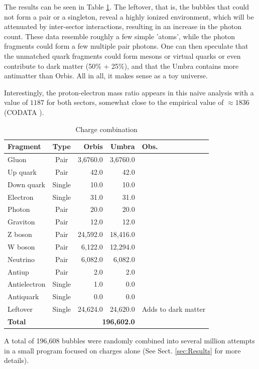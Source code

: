\documentclass[12pt,english]{article}
\begin{document}
The results can be seen in Table \ref{combina}. The leftover, that is, the bubbles that could not form a pair or a singleton, reveal a highly ionized environment, which will be attenuated by inter-sector interactions, resulting in an increase in the photon count. These data resemble roughly a few simple 'atoms', while the photon fragments could form a few multiple pair photons. One can then speculate that the unmatched quark fragments could form mesons or virtual quarks or even contribute to dark matter (50\% + 25\%), and that the Umbra contains more antimatter than Orbis. All in all, it makes sense as a toy universe. 

Interestingly, the proton-electron mass ratio appears in this naive analysis with a value of $1187$ for both sectors, somewhat close to the empirical value of $\approx1836$ (CODATA \cite{codata}). 

\begin{table}
\caption{Charge combination}

\medskip{}
\label{combina}
\begin{centering}
{\small{}}%
\begin{tabular}{|l|c|r|r|l|}
\hline 
\textbf{\small{}Fragment} & \textbf{\small{}Type} & \textbf{\small{}Orbis} & \textbf{Umbra} & \textbf{\small{}Obs.}\tabularnewline
\hline 
\hline 
{\small{}Gluon} & {\small{}Pair} & {\small{}3,6760.0} & {\small{}3,6760.0} & \tabularnewline
\hline 
{\small{}Up quark} & {\small{}Pair} & {\small{}42.0} & {\small{}42.0} & \tabularnewline
\hline 
{\small{}Down quark} & {\small{}Single} & {\small{}10.0} & {\small{}10.0} & \tabularnewline
\hline 
{\small{}Electron} & {\small{}Single} & {\small{}31.0} & {\small{}31.0} & \tabularnewline
\hline 
{\small{}Photon} & {\small{}Pair} & {\small{}20.0} & {\small{}20.0} & \tabularnewline
\hline 
{\small{}Graviton} & {\small{}Pair} & {\small{}12.0} & {\small{}12.0} & \tabularnewline
\hline 
{\small{}Z boson} & {\small{}Pair} & {\small{}24,592.0} & {\small{}18,416.0} & \tabularnewline
\hline 
{\small{}W boson} & {\small{}Pair} & {\small{}6,122.0} & {\small{}12,294.0} & \tabularnewline
\hline 
{\small{}Neutrino} & {\small{}Pair} & {\small{}6,082.0} & {\small{}6,082.0} & \tabularnewline
\hline 
{\small{}Antiup} & {\small{}Pair} & {\small{}2.0} & {\small{}2.0} & \tabularnewline
\hline 
{\small{}Antielectron} & {\small{}Single} & {\small{}1.0} & {\small{}0.0} & \tabularnewline
\hline 
{\small{}Antiquark} & {\small{}Single} & {\small{}0.0} & {\small{}0.0} & \tabularnewline
\hline 
{\small{}Leftover} & {\small{}Single} & {\small{}24,624.0} & {\small{}24,620.0} & {\small{}Adds to dark matter}\tabularnewline
\hline 
\textbf{\small{}Total} &  & \multicolumn{2}{r|}{\textbf{\small{}196,602.0 }} & \tabularnewline
\hline 
\end{tabular}{\small\par}
\par\end{centering}
\medskip{}

{\small{}A total of 196,608 bubbles were randomly combined into several million attempts in a small program focused on charges alone (See Sect. \ref{sec:Results} for more details).}{\small\par}
\end{table}
\end{document}
